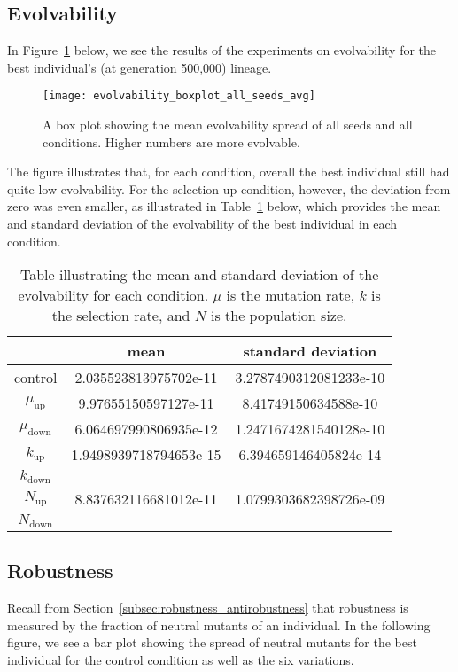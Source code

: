 \subsection{Evolvability}
In Figure~\ref{fig:evolvability_mean} below, we see the results of the experiments on evolvability for the best individual's (at generation 500,000) lineage. 
\begin{figure}[H]
	\centering
	\texttt{[image: evolvability\_boxplot\_all\_seeds\_avg]}
	\caption[Evolvability boxplot]{A box plot showing the mean evolvability spread of all seeds and all conditions. Higher numbers are more evolvable.}
	\label{fig:evolvability_mean}	
\end{figure}
The figure illustrates that, for each condition, overall the best individual still had quite low evolvability. For the selection up condition, however, the deviation from zero was even smaller, as illustrated in Table~\ref{table:mean_std_dev_evolvability} below, which provides the mean and standard deviation of the evolvability of the best individual in each condition. 

\begin{table}[H]
	\centering
	\begin{tabular}{| c | c | c |}
		\hline
		 & \textbf{mean} & \textbf{standard deviation}\\
		 \hline
		 \hline
		 control & 2.035523813975702e-11 & 3.2787490312081233e-10\\
		 \hline
		 $\mu_\text{up}$ & 9.97655150597127e-11 & 8.41749150634588e-10 \\
		 \hline
		 $\mu_\text{down}$ & 6.064697990806935e-12 & 1.2471674281540128e-10 \\
		 \hline
		 $k_\text{up}$ & 1.9498939718794653e-15 & 6.394659146405824e-14 \\
		 \hline
		 $k_\text{down}$ & & \\
		 \hline
		 $N_\text{up}$ & 8.837632116681012e-11 & 1.0799303682398726e-09 \\
		 \hline
		 $N_\text{down}$ & & \\
		 \hline	 		 
	\end{tabular}
	\caption[Evolvability mean and standard deviation]{Table illustrating the mean and standard deviation of the evolvability for each condition. $\mu$ is the mutation rate, $k$ is the selection rate, and $N$ is the population size.}
	\label{table:mean_std_dev_evolvability}
\end{table}
\subsection{Robustness}
Recall from Section~\ref{subsec:robustness_antirobustness} that robustness is measured by the fraction of neutral mutants of an individual. In the following figure, we see a bar plot showing the spread of neutral mutants for the best individual for the control condition as well as the six variations. 

